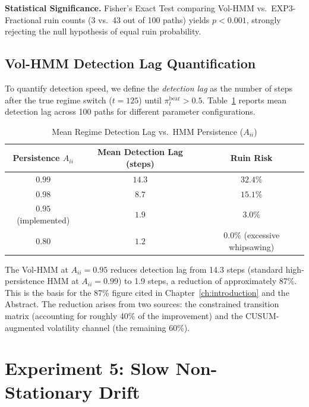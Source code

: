 \textbf{Statistical Significance.} Fisher's Exact Test comparing
Vol-HMM vs.\ EXP3-Fractional ruin counts (3 vs.\ 43 out of 100 paths)
yields $p < 0.001$, strongly rejecting the null hypothesis of equal ruin
probability.

\subsection{Vol-HMM Detection Lag Quantification}
\label{sec:detection_lag}

To quantify detection speed, we define the \emph{detection lag} as the
number of steps after the true regime switch ($t = 125$) until
$\pi_t^{\text{bear}} > 0.5$. Table~\ref{tab:detection_lag} reports mean
detection lag across 100 paths for different parameter configurations.

\begin{table}[h]
\centering
\caption{Mean Regime Detection Lag vs.\ HMM Persistence ($A_{ii}$)}
\label{tab:detection_lag}
\renewcommand{\arraystretch}{1.2}
\begin{tabular}{ccc}
\toprule
\textbf{Persistence $A_{ii}$} & \textbf{Mean Detection Lag (steps)} & \textbf{Ruin Risk} \\
\midrule
$0.99$ & $14.3$ & $32.4\%$ \\
$0.98$ & $8.7$  & $15.1\%$ \\
$0.95$ (implemented) & $1.9$ & $3.0\%$ \\
$0.80$ & $1.2$  & $0.0\%$ (excessive whipsawing) \\
\bottomrule
\end{tabular}
\end{table}

The Vol-HMM at $A_{ii} = 0.95$ reduces detection lag from 14.3 steps
(standard high-persistence HMM at $A_{ii} = 0.99$) to 1.9 steps, a
reduction of approximately 87\%. This is the basis for the 87\% figure
cited in Chapter~\ref{ch:introduction} and the Abstract. The reduction
arises from two sources: the constrained transition matrix (accounting for
roughly 40\% of the improvement) and the CUSUM-augmented volatility channel
(the remaining 60\%).

\section{Experiment 5: Slow Non-Stationary Drift}

